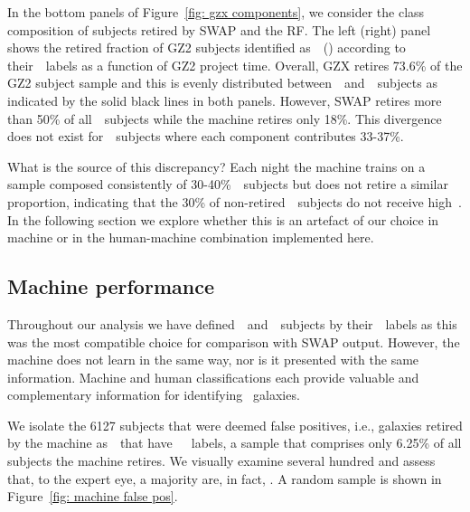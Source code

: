 In the bottom panels of Figure~\ref{fig: gzx components}, we consider the class
composition of subjects retired by SWAP and the RF. 
The left (right) panel shows the retired fraction of GZ2 subjects identified 
as~\feat~(\notfeat) according to their~\raw~labels as a function of GZ2 project time. 
Overall, GZX retires 73.6\% of the GZ2 subject sample and this is evenly 
distributed between~\feat~and~\notfeat~subjects as indicated by the solid
black lines in both panels. 
However, SWAP retires more than 50\% of all~\feat~subjects while the machine
retires only 18\%. This divergence does not exist for~\notfeat~subjects where
each component contributes 33-37\%. 

What is the source of this discrepancy? 
Each night the machine trains on a sample composed consistently of 30-40\%~\feat~subjects but does not retire a similar proportion, indicating
that the 30\% of non-retired~\feat~subjects do not receive high~\pmachine. 
In the following section we explore whether this is an artefact of our choice in machine 
or in the human-machine combination implemented here. 

\subsection{Machine performance}\label{sec: machine performance}

Throughout our analysis we have defined~\feat~and~\notfeat~subjects by 
their~\raw~labels as this was the most compatible choice for comparison with SWAP output.  
However, the machine does not learn in the same way, nor is it presented with the 
same information. Machine and human classifications 
each provide valuable and complementary information for identifying \feat~galaxies.

We isolate the 6127 subjects that were deemed false positives, i.e., galaxies 
retired by the machine as~\feat~that have~\notfeat~\raw~labels, a sample that
comprises only 6.25\% of all subjects the machine retires.
We visually examine several hundred
and assess that, to the expert eye, a majority are, in fact, \feat.  
A random sample is shown in Figure~\ref{fig: machine false pos}. 


